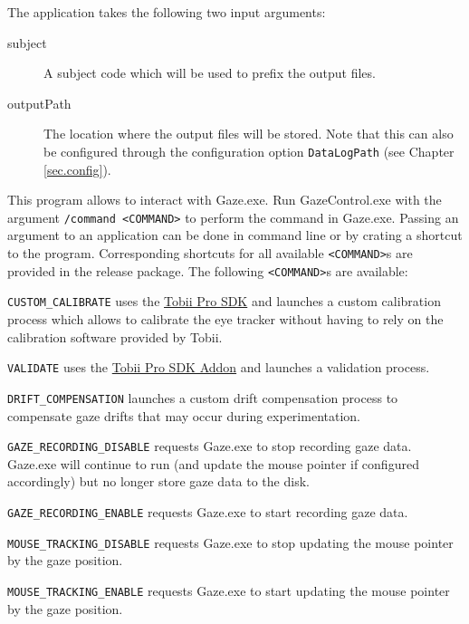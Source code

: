 \documentclass[a4paper,oneside]{book}
\begin{document}
\begin{description}
        The application takes the following two input arguments:
        \begin{description}
            \item[subject]
                A subject code which will be used to prefix the output files.
            \item[outputPath]
                The location where the output files will be stored.
                Note that this can also be configured through the configuration option \texttt{DataLogPath} (see Chapter \ref{sec.config}).
        \end{description}
    \item[GazeControl.exe] This program allows to interact with Gaze.exe.
        Run GazeControl.exe with the argument \texttt{/command <COMMAND>} to perform the command in Gaze.exe.
        Passing an argument to an application can be done in command line or by crating a shortcut to the program.
        Corresponding shortcuts for all available \texttt{<COMMAND>}s are provided in the release package.
        The following \texttt{<COMMAND>}s are available:
        \begin{description}
            \item{\texttt{CUSTOM\_CALIBRATE}} uses the \href{http://developer.tobii.com/tobii-pro-sdk/}{Tobii Pro SDK} and launches a custom calibration process which allows to calibrate the eye tracker without having to rely on the calibration software provided by Tobii.
            \item{\texttt{VALIDATE}} uses the \href{https://github.com/tobiipro/prosdk-addons-dotnet/}{Tobii Pro SDK Addon} and launches a validation process.
            \item{\texttt{DRIFT\_COMPENSATION}} launches a custom drift compensation process to compensate gaze drifts that may occur during experimentation.
            \item{\texttt{GAZE\_RECORDING\_DISABLE}} requests Gaze.exe to stop recording gaze data.
                Gaze.exe will continue to run (and update the mouse pointer if configured accordingly) but no longer store gaze data to the disk.
            \item{\texttt{GAZE\_RECORDING\_ENABLE}} requests Gaze.exe to start recording gaze data.
            \item{\texttt{MOUSE\_TRACKING\_DISABLE}} requests Gaze.exe to stop updating the mouse pointer by the gaze position.
            \item{\texttt{MOUSE\_TRACKING\_ENABLE}} requests Gaze.exe to start updating the mouse pointer by the gaze position.

\end{description}
\end{description}
\end{document}
